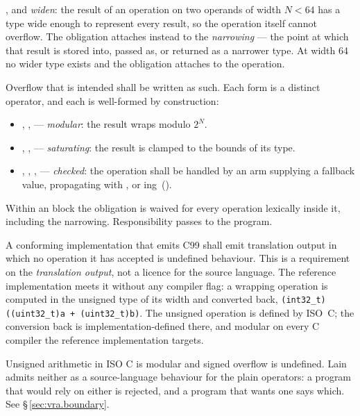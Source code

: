 \pnum
\tok{+}, \tok{-} and \tok{*} \emph{widen}: the result of an operation on two
operands of width $N < 64$ has a type wide enough to represent every result,
so the operation itself cannot overflow.  The obligation attaches instead to
the \emph{narrowing} --- the point at which that result is stored into, passed
as, or returned as a narrower type.  At width 64 no wider type exists and the
obligation attaches to the operation.

\pnum
Overflow that is intended shall be written as such.  Each form is a distinct
operator, and each is well-formed by construction:

\begin{itemize}
  \item \tok{+\%}, \tok{-\%}, \tok{*\%} --- \emph{modular}: the result wraps
        modulo $2^N$.
  \item \tok{+|}, \tok{-|}, \tok{*|} --- \emph{saturating}: the result is
        clamped to the bounds of its type.
  \item {}, , ,  --- \emph{checked}: the
        operation shall be handled by an  arm supplying a
        fallback value, propagating with , or
        \-ing~().
\end{itemize}

\pnum
Within an  block the obligation is waived for every operation
lexically inside it, including the narrowing.  Responsibility passes to the
program.

\pnum
A conforming implementation that emits C99 shall emit translation output in
which no operation it has accepted is undefined behaviour.  This is a requirement on
the \emph{translation output}, not a licence for the source language.  The reference
implementation meets it without any compiler flag: a wrapping operation is computed in
the unsigned type of its width and converted back,
\texttt{(int32\_t)((uint32\_t)a + (uint32\_t)b)}.  The unsigned operation is defined by
ISO~C; the conversion back is implementation-defined there, and modular on every C
compiler the reference implementation targets.

\begin{note}
  Unsigned arithmetic in ISO C is modular and signed overflow is undefined.
  Lain admits neither as a source-language behaviour for the plain operators:
  a program that would rely on either is rejected, and a program that wants
  one says which.  See \S\,\ref{sec:vra.boundary}.
\end{note}
